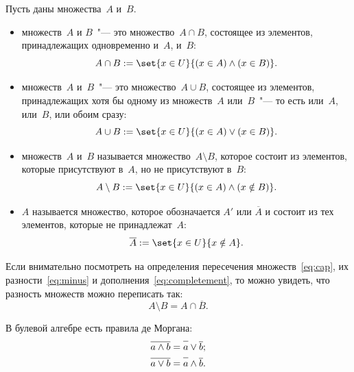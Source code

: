 Пусть даны множества~$A$ и~$B$.
\begin{definition}
	\begin{itemize}
		\item {} множеств~$A$ и $B$~"--- это множество~$A \cap B$, состоящее из элементов, принадлежащих одновременно и~$A$, и~$B$:
			\begin{equation}
				\label{eq:cap}
				A \cap B :=
				\set{x \in U}{
					(x \in A) \wedge (x \in B)
				}
				.
			\end{equation}

		\item
			 множеств~$A$ и~$B$~"--- это множество~$A \cup B$,
			состоящее из элементов, принадлежащих хотя бы одному из множеств~$A$
			или~$B$~"--- то есть или~$A$, или~$B$, или обоим сразу:
			\[
				A \cup B :=
				\set{x \in U}{
					(x \in A) \vee (x \in B)
				}
				.
			\]

		\item {} множеств~$A$ и~$B$ называется множество~$A \setminus B$, которое состоит из элементов, которые присутствуют в~$A$, но не присутствуют в~$B$:
			\begin{equation}
				\label{eq:minus}
				A \setminus B := 
				\set{x \in U}{
					(x \in A) \wedge (x \notin B)
				}
				.
			\end{equation}

		\item {} $A$ называется множество, которое обозначается $A'$ или $\overline{A}$ и состоит из тех элементов, которые не принадлежат~$A$:
			\begin{equation}
				\label{eq:completement}
				\overline{A} := \set{x \in U}{x \notin A}
				.
			\end{equation}
	\end{itemize}
\end{definition}

Если внимательно посмотреть на определения пересечения множеств~\eqref{eq:cap}, их разности~\eqref{eq:minus} и дополнения~\eqref{eq:completement}, то можно увидеть, что разность множеств можно переписать так:
\[
	A \setminus B = A \cap \overline{B}.
\]

В булевой алгебре есть правила де Моргана:
\begin{align*}
	\overline{a \wedge b} &= \overline{\mathstrut a} \vee   \overline{b};
	\\
	\overline{a \vee b}   &= \overline{\mathstrut a} \wedge \overline{b}.
\end{align*}

